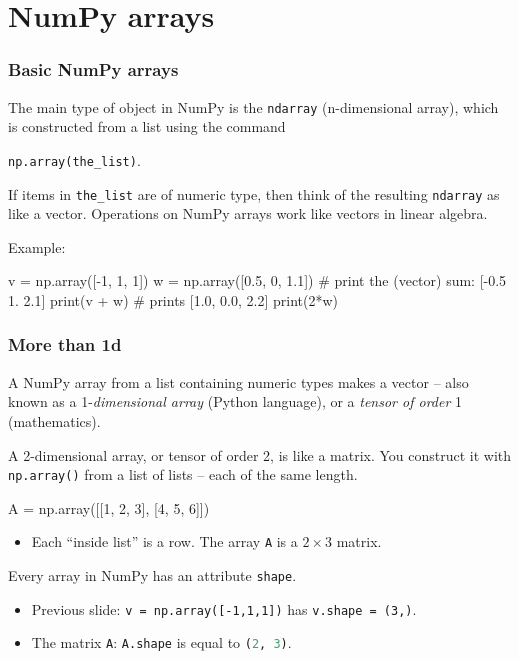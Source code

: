 \documentclass{beamer}
\newenvironment{codeblock}
    {\hfill\begin{beamerboxesrounded}[lower=codecol, width=0.8\textwidth]
    \medskip

    }
    { 
    \end{beamerboxesrounded}\hfill
    }
\theoremstyle{example}
\newcommand{\ct}[1]{\lstinline[language=Python]!#1!}
\newcommand{\ttt}[1]{{\small\texttt{#1}}}
\begin{document}
\section{NumPy arrays}
\begin{frame}[fragile]
\frametitle{Basic NumPy arrays}
The main type of object in NumPy is the \ttt{ndarray} (n-dimensional array), which is constructed from a list using the command 
\begin{center}\ttt{np.array(the}\ct{_}\ttt{list)}.\end{center}

\vspace*{12pt}
If items in \ttt{the}\ct{_}\ttt{list} are of numeric type, then think of the resulting \ttt{ndarray} as like a vector. Operations on NumPy arrays work like vectors in linear algebra.
\vspace*{12pt}

Example:

\begin{codeblock}

\begin{python}
v = np.array([-1, 1, 1])
w = np.array([0.5, 0, 1.1])
# print the (vector) sum: [-0.5  1.   2.1]
print(v + w)
# prints [1.0, 0.0, 2.2]
print(2*w)
\end{python}

\end{codeblock}

\end{frame}

\begin{frame}[fragile]
\frametitle{More than {\ttm 1d}}
A NumPy array from a list containing numeric types makes a vector {--} also known as a 1-\emph{dimensional array} (Python language), or a \emph{tensor of order} 1 (mathematics). 

A 2-dimensional array, or tensor of order 2, is like a matrix. You construct it with \ttt{np.array()} from a list of lists {--} each of the same length.

\begin{codeblock}

\begin{python}[numbers=none]
A = np.array([[1, 2, 3], [4, 5, 6]])
\end{python}

\end{codeblock}

\begin{itemize}
    \item[] Each ``inside list'' is a row. The array \ttt{A} is a $2\times 3$ matrix.
\end{itemize}

Every array in NumPy has an attribute \ttt{shape}. 
\begin{itemize}
    \item Previous slide: \ttt{v = np.array([-1,1,1])} has \ttt{v.shape = (3,)}. 
    \item The matrix \ttt{A}: \ttt{A.shape} is equal to \ct{(2, 3)}.
\end{itemize}
\end{frame}
\end{document}
